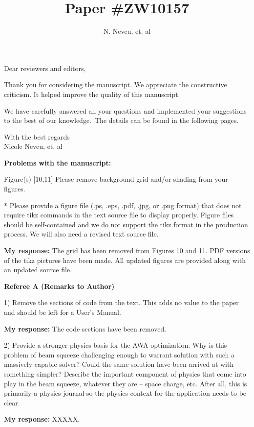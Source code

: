 \documentclass{article}
\begin{document}
\title {Paper  \#ZW10157}
\author {N. Neveu, et. al}

\maketitle
Dear reviewers and editors,

Thank you for considering the manuscript.
We appreciate the constructive criticism. 
It helped improve the quality of this manuscript.

We have carefully answered all your questions and implemented your suggestions to the best of our knowledge.\ The details can be found in the following pages.

With the best regards  \\[3mm]
 
Nicole Neveu, et. al

\pagebreak

{\bf Problems with the manuscript:}

{ Figure(s) [10,11] 
	Please remove background grid and/or shading from your figures.

* Please provide a figure file (.ps, .eps, .pdf, .jpg, or .png format)
that does not require tikz commands in the text source file to
display properly. Figure files should be self-contained and we do
not support the tikz format in the production process. We will also
need a revised text source file.}

{\bf My response:} {\color{blue} The grid has been removed from Figures 10 and 11.
PDF versions of the tikz pictures have been made. All updated figures are provided 
along with an updated source file.}


{\bf Referee A (Remarks to Author)}

1) Remove the sections of code from the text. This adds no value to
	the paper and should be left for a User’s Manual.

{\bf My response:} {\color{blue} The code sections have been removed.}


2) Provide a stronger physics basis for the AWA optimization. Why is
this problem of beam squeeze challenging enough to warrant solution
with such a massively capable solver? Could the same solution have
been arrived at with something simpler? Describe the important
component of physics that come into play in the beam squeeze, whatever
they are – space charge, etc. After all, this is primarily a physics
journal so the physics context for the application needs to be clear.

{\bf My response:} {\color{blue} XXXXX.}
\end{document}
